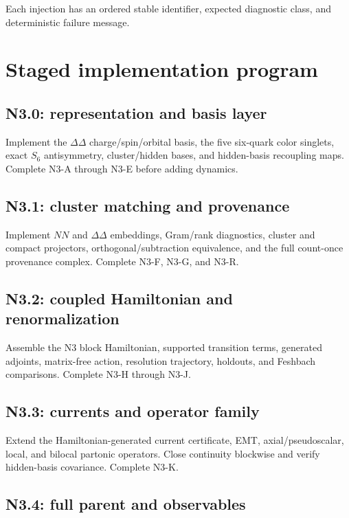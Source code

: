 \documentclass[11pt]{article}
\begin{document}
Each injection has an ordered stable identifier, expected diagnostic class, and deterministic failure message.

\section{Staged implementation program}
\label{sec:stages}

\subsection{N3.0: representation and basis layer}

Implement the \(\Delta\Delta\) charge/spin/orbital basis, the five six-quark color singlets, exact \(S_6\) antisymmetry, cluster/hidden bases, and hidden-basis recoupling maps.  Complete N3-A through N3-E before adding dynamics.

\subsection{N3.1: cluster matching and provenance}

Implement \(NN\) and \(\Delta\Delta\) embeddings, Gram/rank diagnostics, cluster and compact projectors, orthogonal/subtraction equivalence, and the full count-once provenance complex.  Complete N3-F, N3-G, and N3-R.

\subsection{N3.2: coupled Hamiltonian and renormalization}

Assemble the N3 block Hamiltonian, supported transition terms, generated adjoints, matrix-free action, resolution trajectory, holdouts, and Feshbach comparisons.  Complete N3-H through N3-J.

\subsection{N3.3: currents and operator family}

Extend the Hamiltonian-generated current certificate, EMT, axial/pseudoscalar, local, and bilocal partonic operators.  Close continuity blockwise and verify hidden-basis covariance.  Complete N3-K.

\subsection{N3.4: full parent and observables}
\end{document}
